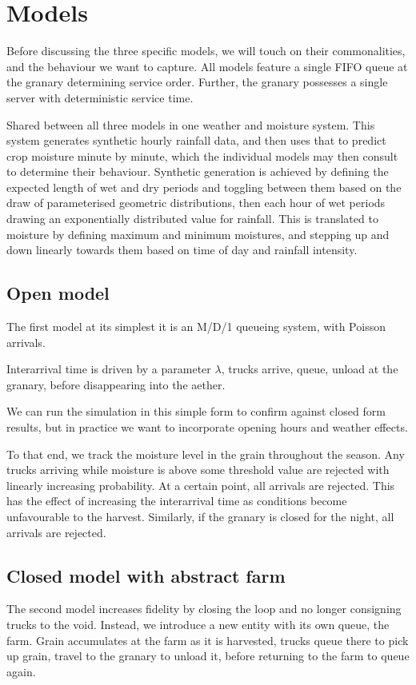 \documentclass[a4paper, 10.5pt, oneside]{report}
\begin{document}
\chapter{Models}
Before discussing the three specific models, we will touch on their commonalities, and the behaviour
we want to capture. All models feature a single FIFO queue at the granary determining service order.
Further, the granary possesses a single server with deterministic service time.

Shared between all three models in one weather and moisture system. This system generates synthetic
hourly rainfall data, and then uses that to predict crop moisture minute by minute, which the individual
models may then consult to determine their behaviour. Synthetic generation is achieved by defining the
expected length of wet and dry periods and toggling between them based on the draw of parameterised geometric
distributions, then each hour of wet periods drawing an exponentially distributed value for rainfall. This
is translated to moisture by defining maximum and minimum moistures, and stepping up and down linearly towards them
based on time of day and rainfall intensity.




\section{Open model}
The first model at its simplest it is an M/D/1 queueing system, with Poisson arrivals.

Interarrival time is driven by a parameter $\lambda$, trucks arrive, queue, unload at the granary, before
disappearing into the aether.

We can run the simulation in this simple form to confirm against closed form results, but in practice
we want to incorporate opening hours and weather effects.

To that end, we track the moisture level in the grain throughout the season. Any trucks arriving while
moisture is above some threshold value are rejected with linearly increasing probability. At a certain
point, all arrivals are rejected. This has the effect of increasing the interarrival time as conditions
become unfavourable to the harvest. Similarly, if the granary is closed for the night,
all arrivals are rejected.


\section{Closed model with abstract farm}
The second model increases fidelity by closing the loop and no longer consigning trucks to the void.
Instead, we introduce a new entity with its own queue, the farm. Grain accumulates at the farm as
it is harvested, trucks queue there to pick up grain, travel to the granary to unload it, before
returning to the farm to queue again.
\end{document}
